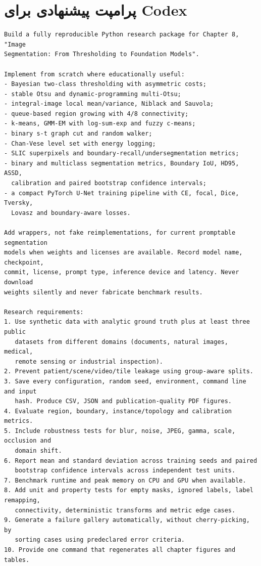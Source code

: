 \documentclass[12pt,openany,oneside]{book}
\begin{document}
\section{پرامپت پیشنهادی برای Codex}
\begin{latin}
\begin{lstlisting}[language={}]
Build a fully reproducible Python research package for Chapter 8, "Image
Segmentation: From Thresholding to Foundation Models".

Implement from scratch where educationally useful:
- Bayesian two-class thresholding with asymmetric costs;
- stable Otsu and dynamic-programming multi-Otsu;
- integral-image local mean/variance, Niblack and Sauvola;
- queue-based region growing with 4/8 connectivity;
- k-means, GMM-EM with log-sum-exp and fuzzy c-means;
- binary s-t graph cut and random walker;
- Chan-Vese level set with energy logging;
- SLIC superpixels and boundary-recall/undersegmentation metrics;
- binary and multiclass segmentation metrics, Boundary IoU, HD95, ASSD,
  calibration and paired bootstrap confidence intervals;
- a compact PyTorch U-Net training pipeline with CE, focal, Dice, Tversky,
  Lovasz and boundary-aware losses.

Add wrappers, not fake reimplementations, for current promptable segmentation
models when weights and licenses are available. Record model name, checkpoint,
commit, license, prompt type, inference device and latency. Never download
weights silently and never fabricate benchmark results.

Research requirements:
1. Use synthetic data with analytic ground truth plus at least three public
   datasets from different domains (documents, natural images, medical,
   remote sensing or industrial inspection).
2. Prevent patient/scene/video/tile leakage using group-aware splits.
3. Save every configuration, random seed, environment, command line and input
   hash. Produce CSV, JSON and publication-quality PDF figures.
4. Evaluate region, boundary, instance/topology and calibration metrics.
5. Include robustness tests for blur, noise, JPEG, gamma, scale, occlusion and
   domain shift.
6. Report mean and standard deviation across training seeds and paired
   bootstrap confidence intervals across independent test units.
7. Benchmark runtime and peak memory on CPU and GPU when available.
8. Add unit and property tests for empty masks, ignored labels, label remapping,
   connectivity, deterministic transforms and metric edge cases.
9. Generate a failure gallery automatically, without cherry-picking, by
   sorting cases using predeclared error criteria.
10. Provide one command that regenerates all chapter figures and tables.
\end{lstlisting}
\end{latin}
\end{document}
